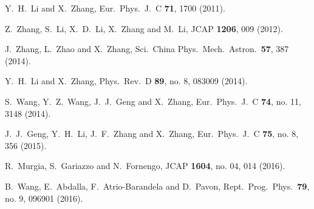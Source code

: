 \documentclass[aps,prd,nofootinbib,amsmath,amssymb,twocolumn,superscriptaddress,10pt]{revtex4}%
\begin{document}
\begin{thebibliography}{}
  Y.~H.~Li and X.~Zhang,
  Eur.\ Phys.\ J.\ C {\bf 71}, 1700 (2011).

  Z.~Zhang, S.~Li, X.~D.~Li, X.~Zhang and M.~Li,
  JCAP {\bf 1206}, 009 (2012).

  J.~Zhang, L.~Zhao and X.~Zhang,
  Sci.\ China Phys.\ Mech.\ Astron.\  {\bf 57}, 387 (2014).


  Y.~H.~Li and X.~Zhang,
  Phys.\ Rev.\ D {\bf 89}, no. 8, 083009 (2014).

  S.~Wang, Y.~Z.~Wang, J.~J.~Geng and X.~Zhang,
  Eur.\ Phys.\ J.\ C {\bf 74}, no. 11, 3148 (2014).


  J.~J.~Geng, Y.~H.~Li, J.~F.~Zhang and X.~Zhang,
  Eur.\ Phys.\ J.\ C {\bf 75}, no. 8, 356 (2015).


  R.~Murgia, S.~Gariazzo and N.~Fornengo,
  JCAP {\bf 1604}, no. 04, 014 (2016).


  B.~Wang, E.~Abdalla, F.~Atrio-Barandela and D.~Pavon,
  Rept.\ Prog.\ Phys.\  {\bf 79}, no. 9, 096901 (2016).



\end{thebibliography}
\end{document}
